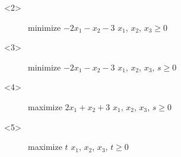 \documentclass[32pt, aspectratio = 169]{beamer}
\begin{document}
\begin{frame}
\begin{columns}
\begin{column}{.55\textwidth}
\begin{overlayarea}{\textwidth}{.55\textheight}
        \begin{onlyenv}<2>
         ~
          \begin{figure}
            \begin{linearProg}{
                minimize
              }{
                $-2x_1 - x_2 - 3$
              }{
              }{
                $x_1$, $x_2$, $x_3 \geq 0$
              }
            \end{linearProg}
          \end{figure}
        \end{onlyenv}
        \begin{onlyenv}<3>
          \begin{figure}
            \begin{linearProg}{
                minimize
              }{
                $-2x_1 - x_2 - 3$
              }{
              }{
                $x_1$, $x_2$, $x_3$, $s \geq 0$
              }
            \end{linearProg}
          \end{figure}
        \end{onlyenv}
        \begin{onlyenv}<4>
          \begin{figure}
            \begin{linearProg}{
                maximize
              }{
                $2x_1 + x_2 + 3$
              }{
              }{
                $x_1$, $x_2$, $x_3$, $s \geq 0$
              }
            \end{linearProg}
          \end{figure}
        \end{onlyenv}
        \begin{onlyenv}<5>
          \begin{figure}
            \begin{linearProg}{
                maximize
              }{
                $t$
              }{
              }{
                $x_1$, $x_2$, $x_3$, $t \geq 0$
              }
            \end{linearProg}
          \end{figure}
        \end{onlyenv}
      \end{overlayarea}
    \end{column}
  \end{columns}
\end{frame}
\end{document}
